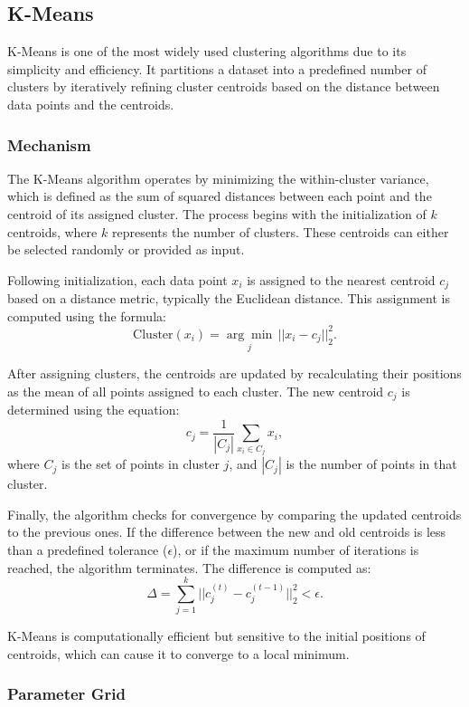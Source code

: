 
\subsection{K-Means}
\label{subsec:methods-kmeans}

K-Means is one of the most widely used clustering algorithms due to its simplicity and efficiency. It partitions a dataset into a predefined number of clusters by iteratively refining cluster centroids based on the distance between data points and the centroids.

\subsubsection{Mechanism}

The K-Means algorithm operates by minimizing the within-cluster variance, which is defined as the sum of squared distances between each point and the centroid of its assigned cluster. The process begins with the initialization of \(k\) centroids, where \(k\) represents the number of clusters. These centroids can either be selected randomly or provided as input.

Following initialization, each data point \(x_i\) is assigned to the nearest centroid \(c_j\) based on a distance metric, typically the Euclidean distance. This assignment is computed using the formula:  
\[
\text{Cluster}(x_i) = \underset{j}{\arg\min} \, ||x_i - c_j||_2^2.
\]

After assigning clusters, the centroids are updated by recalculating their positions as the mean of all points assigned to each cluster. The new centroid \(c_j\) is determined using the equation:  
\[
c_j = \frac{1}{|C_j|} \sum_{x_i \in C_j} x_i,
\]  
where \(C_j\) is the set of points in cluster \(j\), and \(|C_j|\) is the number of points in that cluster.

Finally, the algorithm checks for convergence by comparing the updated centroids to the previous ones. If the difference between the new and old centroids is less than a predefined tolerance (\(\epsilon\)), or if the maximum number of iterations is reached, the algorithm terminates. The difference is computed as:  
\[
\Delta = \sum_{j=1}^{k} ||c_j^{(t)} - c_j^{(t-1)}||_2^2 < \epsilon.
\]

K-Means is computationally efficient but sensitive to the initial positions of centroids, which can cause it to converge to a local minimum.

\subsubsection{Parameter Grid}

